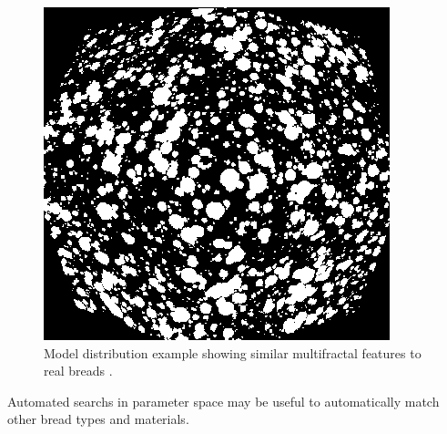 \documentclass[final,5p,times]{elsarticle}
\begin{document}
{\begin{figure}[!ht]
\begin{center}
\includegraphics[scale=0.4]{bestwarp.png}
\caption{Model distribution example showing similar multifractal features to real breads .}
\label{bestwarp}
\end{center}
\end{figure}


Automated searchs in parameter space may be useful to automatically match other bread types and materials.





}
\end{document}
